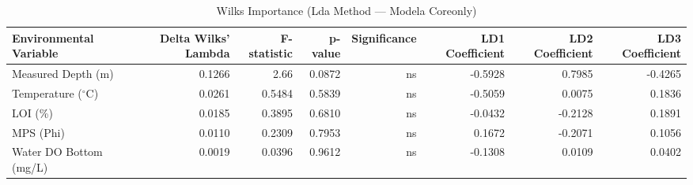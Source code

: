 \begin{table}[htbp]
  \centering
  \caption{Wilks Importance (Lda Method — Modela Coreonly)}
  \label{tab:LDA_Method_ModelA_CoreOnly_tables_wilks_importance}
  \small
  \begin{tabular}{lrrrrrrr}
    \toprule
    Environmental Variable & Delta Wilks' Lambda & F-statistic & p-value & Significance & LD1 Coefficient & LD2 Coefficient & LD3 Coefficient \\
    \midrule
    Measured Depth (m) & 0.1266 & 2.66 & 0.0872 & ns & -0.5928 & 0.7985 & -0.4265 \\
    Temperature ($^{\circ}$C) & 0.0261 & 0.5484 & 0.5839 & ns & -0.5059 & 0.0075 & 0.1836 \\
    LOI (\%) & 0.0185 & 0.3895 & 0.6810 & ns & -0.0432 & -0.2128 & 0.1891 \\
    MPS (Phi) & 0.0110 & 0.2309 & 0.7953 & ns & 0.1672 & -0.2071 & 0.1056 \\
    Water DO Bottom (mg/L) & 0.0019 & 0.0396 & 0.9612 & ns & -0.1308 & 0.0109 & 0.0402 \\
    \bottomrule
  \end{tabular}
\end{table}
